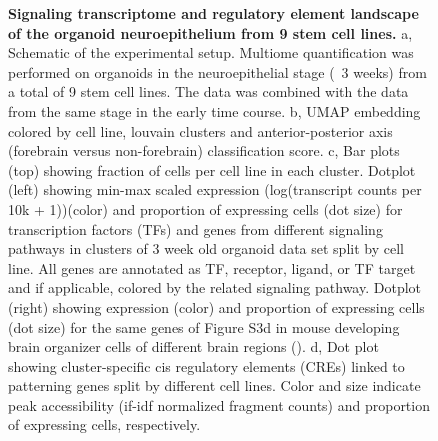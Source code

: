 \begin{figure}[t!]
    \centering
    \caption{\textbf{Signaling transcriptome and regulatory element landscape of the organoid neuroepithelium from 9 stem cell lines.} a, Schematic of the experimental setup. Multiome quantification was performed on organoids in the neuroepithelial stage (~3 weeks) from a total of 9 stem cell lines. The data was combined with the data from the same stage in the early time course. b, UMAP embedding colored by cell line, louvain clusters and anterior-posterior axis (forebrain versus non-forebrain) classification score. c, Bar plots (top) showing fraction of cells per cell line in each cluster. Dotplot (left) showing min-max scaled expression (log(transcript counts per 10k + 1))(color) and proportion of expressing cells (dot size) for transcription factors (TFs) and genes from different signaling pathways in clusters of 3 week old organoid data set split by cell line. All genes are annotated as TF, receptor, ligand, or TF target and if applicable, colored by the related signaling pathway. Dotplot (right) showing expression (color) and proportion of expressing cells (dot size) for the same genes of Figure S3d in mouse developing brain organizer cells of different brain regions (\cite{la_manno_molecular_2021}). d, Dot plot showing cluster-specific cis regulatory elements (CREs) linked to patterning genes split by different cell lines. Color and size indicate peak accessibility (if-idf normalized fragment counts) and proportion of expressing cells, respectively.}
\end{figure}

\clearpage

